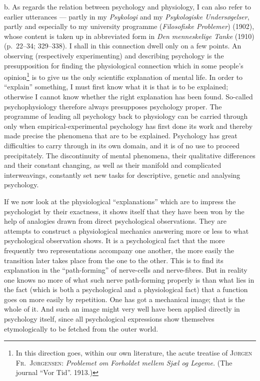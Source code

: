 \documentclass[12pt]{book}
\newcommand{\opage}[1]{\marginnote{\footnotesize\textit{[#1]}}}
\begin{document}
b. As regards the relation between psychology and physiology, I can also refer to
earlier utterances --- partly in my \textit{Psykologi} and my \textit{Psykologiske
Undersøgelser}, partly and especially to my university programme
(\textit{Filosofiske Problemer}) (1902), whose content is taken up in abbreviated
form in \textit{Den menneskelige Tanke} (1910) (p.\ 22--34; 329--338). I shall in
this connection dwell only on a few \opage{113}points. An observing (respectively
experimenting) and describing psychology is the presupposition for finding the
physiological connection which in some people's opinion\footnote{In this
direction goes, within our own literature, the acute treatise of \textsc{Jørgen
Fr.\ Jørgensen: }\textit{Problemet om Forholdet mellem Sjæl og Legeme.}
(The journal ``Vor Tid''. 1913.)} is to give us the only scientific explanation of
mental life. In order to ``explain'' something, I must first know what it is that
is to be explained; otherwise I cannot know whether the right explanation has been
found. So-called psychophysiology therefore always presupposes psychology proper.
The programme of leading all psychology back to physiology can be carried through
only when empirical-experimental psychology has first done its work and thereby
made precise the phenomena that are to be explained. Psychology has great
difficulties to carry through in its own domain, and it is of no use to proceed
precipitately. The discontinuity of mental phenomena, their qualitative
differences and their constant changing, as well as their manifold and
complicated interweavings, constantly set new tasks for descriptive, genetic and
analysing psychology.

If we now look at the physiological ``explanations'' which are to impress the
psychologist by their exactness, it shows itself that they have been won by the
help of analogies drawn from direct psychological observations. They are attempts
to construct a physiological mechanics answering more or less to what
psychological ob\-ser\-va\-tion shows. It is a psychological fact that the more
fre\-quent\-ly two rep\-re\-sen\-ta\-tions accompany one another, the more easily the
transition later takes place from the one to the other. This is to find its
explanation in the ``path-forming'' of nerve-cells and nerve-fibres. But in
reality one knows no more of what such nerve path-forming properly is than what
lies in the \opage{114}fact (which is both a psychological and a physiological fact) that a
function goes on more easily by repetition. One has got a mechanical image; that
is the whole of it. And such an image might very well have been applied directly
in psychology itself, since all psychological expressions show themselves
etymologically to be fetched from the outer world.
\end{document}
